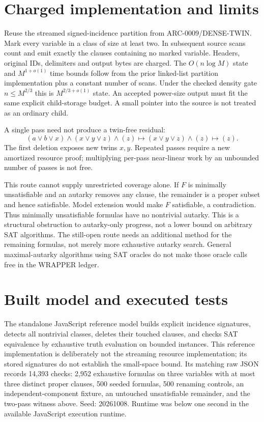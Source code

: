 \documentclass[11pt]{article}
\begin{document}
\section{Charged implementation and limits}
Reuse the streamed signed-incidence partition from ARC-0009/DENSE-TWIN.
Mark every variable in a class of size at least two. In subsequent
source scans count and emit exactly the clauses containing no marked
variable. Headers, original IDs, delimiters and output bytes are charged.
The $O(n\log M)$ state and $M^{1+o(1)}$ time bounds follow from the prior
linked-list partition implementation plus a constant number of scans.
Under the checked density gate $n\le M^{2/3}$ this is
$M^{2/3+o(1)}$ state. An accepted power-size output must fit the same
explicit child-storage budget. A small pointer into the source is
not treated as an ordinary child.

A single pass need not produce a twin-free residual:
\[
 (a\lor b\lor x)\land(x\lor y\lor z)\land(z)
 \longmapsto (x\lor y\lor z)\land(z)
 \longmapsto (z).
\]
The first deletion exposes new twins $x,y$. Repeated passes require
a new amortized resource proof; multiplying per-pass near-linear work
by an unbounded number of passes is not free.

This route cannot supply unrestricted coverage alone. If $F$ is
minimally unsatisfiable and an autarky removes any clause, the remainder
is a proper subset and hence satisfiable. Model extension would make
$F$ satisfiable, a contradiction. Thus minimally unsatisfiable formulas
have no nontrivial autarky. This is a structural obstruction to
autarky-only progress, not a lower bound on arbitrary SAT algorithms.
The still-open route needs an additional method for the remaining
formulas, not merely more exhaustive autarky search.
General maximal-autarky algorithms using SAT oracles \cite{maxaut}
do not make those oracle calls free in the WRAPPER ledger.

\section{Built model and executed tests}
The standalone JavaScript reference model
builds explicit incidence signatures, detects all nontrivial classes,
deletes their touched clauses, and checks SAT equivalence by exhaustive
truth evaluation on bounded instances. This reference implementation
is deliberately not the streaming resource implementation; its
stored signatures do not establish the small-space bound.
Its matching raw JSON records 14,393 checks:
2,952 exhaustive formulas on three variables with at most three
distinct proper clauses, 500 seeded formulas, 500 renaming controls,
an independent-component fixture, an untouched unsatisfiable remainder,
and the two-pass witness above. Seed: 20261008. Runtime was below
one second in the available JavaScript execution runtime.
\end{document}
